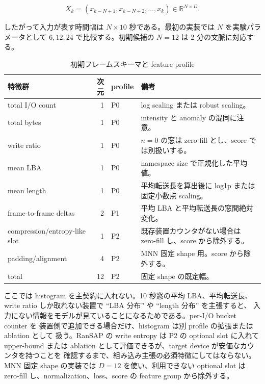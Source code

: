 \begin{equation}
  X_k = (x_{k-N+1}, x_{k-N+2}, \ldots, x_k) \in \mathbb{R}^{N \times D}.
  \label{eq:sequence}
\end{equation}

したがって入力が表す時間幅は $N \times 10$ 秒である。最初の実装では
$N$ を実験パラメータとして $6,12,24$ で比較する。初期候補の $N=12$ は
2 分の文脈に対応する。

\begin{table}[tb]
  \centering
  \caption{初期フレームスキーマと feature profile}
  \label{tab:feature-schema}
  \begin{tabularx}{\linewidth}{lrlY}
    \toprule
    特徴群 & 次元 & profile & 備考 \\
    \midrule
    total I/O count & 1 & P0 & log scaling または robust scaling。 \\
    total bytes & 1 & P0 & intensity と anomaly の混同に注意。 \\
    write ratio & 1 & P0 & $n=0$ の窓は zero-fill とし、score では別扱いする。 \\
    mean LBA & 1 & P0 & namespace size で正規化した平均値。 \\
    mean length & 1 & P0 & 平均転送長を算出後に log1p または固定小数点 scaling。 \\
    frame-to-frame deltas & 2 & P1 & 平均 LBA と平均転送長の窓間絶対変化。 \\
    compression/entropy-like slot & 1 & P2 & 既存装置カウンタがない場合は zero-fill し、score から除外する。 \\
    padding/alignment & 4 & P2 & MNN 固定 shape 用。score から除外する。 \\
    \midrule
    total & 12 & P2 & 固定 shape の既定幅。 \\
    \bottomrule
  \end{tabularx}
\end{table}

ここでは histogram を主契約に入れない。10 秒窓の平均 LBA、平均転送長、
write ratio しか取れない装置で ``LBA 分布'' や ``length 分布'' を主張すると、
入力にない情報をモデルが見ていることになるためである。per-I/O bucket counter を
装置側で追加できる場合だけ、histogram は別 profile の拡張または ablation として
扱う。RanSAP の write entropy は P2 の optional slot に入れて upper-bound または
ablation として評価できるが、target device が安価なカウンタを持つことを
確認するまで、組み込み主張の必須特徴にしてはならない。
MNN 固定 shape の実装では $D=12$ を使い、利用できない optional slot は
zero-fill し、normalization、loss、score の feature group から除外する。

